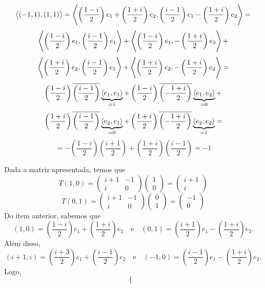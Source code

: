 \documentclass[11pt,a4paper]{article}
\begin{document}
{{\begin{itemize}
\[\left\langle (-1,1),(1,1) \right\rangle = \left\langle \left(\frac{1 - i}{2}\right)e_1 + \left(\frac{1+i}{2} \right)e_2, \left(\frac{i - 1}{2}\right)e_1 - \left(\frac{1+i}{2} \right)e_2 \right\rangle = \]\[
\left\langle \left(\frac{1 - i}{2}\right)e_1, \left(\frac{i - 1}{2}\right)e_1 \right\rangle + \left\langle \left(\frac{1 - i}{2}\right)e_1, - \left(\frac{1+i}{2} \right)e_2 \right\rangle + \]\[ \left\langle \left(\frac{1+i}{2} \right)e_2, \left(\frac{i - 1}{2}\right)e_1 \right\rangle + \left\langle \left(\frac{1+i}{2} \right)e_2, - \left(\frac{1+i}{2} \right)e_2 \right\rangle = 
\]\[
\left(\frac{1 - i}{2}\right) \overline{\left(\frac{i - 1}{2}\right)}  \underbrace{\left\langle e_1, e_1 \right\rangle}_{=1}+ \left(\frac{1 - i}{2}\right)\overline{  \left(-\frac{1+i}{2} \right) } \underbrace{\left\langle e_1, e_2 \right\rangle}_{=0}+\]\[ \left(\frac{1+i}{2} \right) \overline{\left(\frac{i - 1}{2}\right)} \underbrace{\left\langle e_2, e_1 \right\rangle}_{=0}+ \left(\frac{1+i}{2} \right) \overline{\left(-\frac{1+i}{2} \right)} \underbrace{\left\langle e_2, e_2 \right\rangle}_{=1}= \]\[
= -\left(\frac{1 - i}{2}\right) \left(\frac{i + 1}{2}\right) + \left(\frac{1+i}{2} \right) \left(\frac{i-1}{2} \right) = -1 
\]
\end{itemize}
\task[\pers{b}] Dada a matriz apresentada, temos que 
\[
T(1,0) = \begin{pmatrix}
  i+1 & -1 \\
  i & 0
  \end{pmatrix}\begin{pmatrix}
  1 \\
  0
  \end{pmatrix} = \begin{pmatrix}
  i+1 \\
  i
  \end{pmatrix}
\]
\[
T(0,1) = \begin{pmatrix}
  i+1 & -1 \\
  i & 0
  \end{pmatrix}\begin{pmatrix}
  0 \\
  1
  \end{pmatrix} = \begin{pmatrix}
  -1 \\
  0
  \end{pmatrix}
\]
Do item anterior, sabemos que 
\[
(1,0) = \left(\frac{1 - i}{2}\right)e_1 + \left(\frac{1+i}{2} \right)e_2 \quad \mbox{e} \quad (0,1) =  \left(\frac{i + 1}{2}\right)e_1 - \left(\frac{1+i}{2} \right)e_2.
\]
Além disso, 
\[
(i+1,i) = \left(\frac{i+3}{2}\right)e_1 + \left(\frac{i-1}{2} \right)e_2 \quad \mbox{e} \quad (-1,0) =  \left(\frac{i - 1}{2}\right)e_1 - \left(\frac{1+i}{2} \right)e_2.
\]
Logo,
\[
\begin{cases}

\end{cases}\]}}
\end{document}
